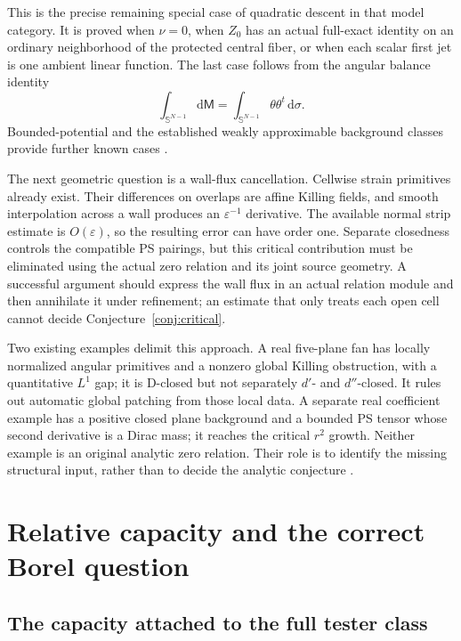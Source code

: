 \documentclass[11pt,a4paper]{article}
\newcommand{\Conjref}[1]{Conjecture~\ref{#1}}
\theoremstyle{definition}
\theoremstyle{remark}
\numberwithin{equation}{section}
\newcommand{\D}{\mathrm D}
\newcommand{\dd}{\mathrm d}
\begin{document}
This is the precise remaining special case of quadratic descent in
that model category.  It is proved when $\nu=0$, when $Z_0$ has an
actual full-exact identity on an ordinary neighborhood of the protected
central fiber, or when each scalar first jet is one ambient linear
function.  The last case follows from the angular balance identity
\begin{equation}
          \int_{\mathbb S^{N-1}}\dd\mathsf M
             =\int_{\mathbb S^{N-1}}\theta\theta^t\,\dd\sigma.
                         \label{eq:angular-moment}
\end{equation}
Bounded-potential and the established weakly approximable background
classes provide further known cases \cite{Rchain,I13}.

The next geometric question is a wall-flux cancellation.  Cellwise
strain primitives already exist.  Their differences on overlaps are
affine Killing fields, and smooth interpolation across a wall produces
an $\varepsilon^{-1}$ derivative.  The available normal strip estimate
is $O(\varepsilon)$, so the resulting error can have order one.
Separate closedness controls the compatible PS pairings, but this
critical contribution must be eliminated using the actual zero
relation and its joint source geometry.  A successful argument should
express the wall flux in an actual relation module and then annihilate
it under refinement; an estimate that only treats each open cell
cannot decide \Conjref{conj:critical}.

Two existing examples delimit this approach.  A real five-plane fan
has locally normalized angular primitives and a nonzero global
Killing obstruction, with a quantitative $L^1$ gap; it is $\D$-closed
but not separately $d'$- and $d''$-closed.  It rules out automatic
global patching from those local data.  A separate real coefficient
example has a positive closed plane background and a bounded PS tensor
whose second derivative is a Dirac mass; it reaches the critical
$r^2$ growth.  Neither example is an original analytic zero relation.
Their role is to identify the missing structural input, rather than
to decide the analytic conjecture \cite{I13}.

\section{Relative capacity and the correct Borel question}
\label{sec:capacity}

\subsection{The capacity attached to the full tester class}
\end{document}
